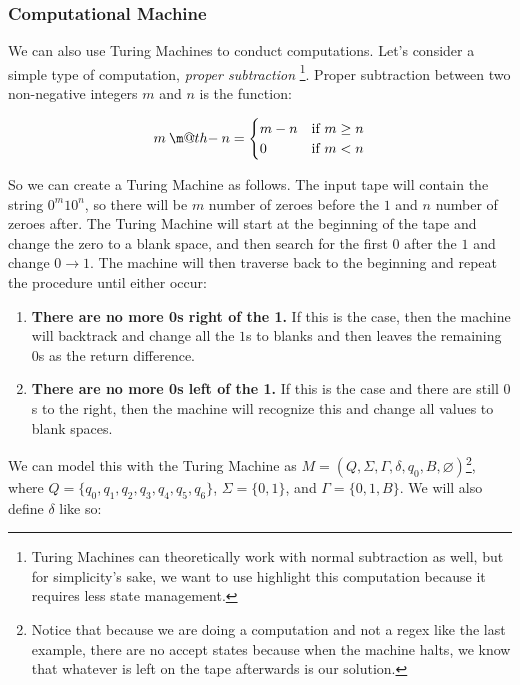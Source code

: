 \documentclass[12pt]{article}
\makeatletter
\newcommand{\dotminus}{\mathbin{\text{\@dotminus}}}
\newcommand{\@dotminus}{%
  \ooalign{\hidewidth\raise1ex\hbox{.}\hidewidth\cr$\m@th-$\cr}%
}
\makeatother
\begin{document}
\subsubsection*{Computational Machine}

We can also use Turing Machines to conduct computations. Let's consider a simple type of computation, \textit{proper subtraction} \footnote{Turing Machines can theoretically work with normal subtraction as well, but for simplicity's sake, we want to use highlight this computation because it requires less state management.}. Proper subtraction between two non-negative integers $m$ and $n$ is the function:

\[
m \dotminus n =  
\begin{cases} 
      m-n & \text{if $m\geq n$} \\
      0 & \text{if $m<n$}
   \end{cases}
\]

So we can create a Turing Machine as follows. The input tape will contain the string $0^m10^n$, so there will be $m$ number of zeroes before the $1$ and $n$ number of zeroes after. The Turing Machine will start at the beginning of the tape and change the zero to a blank space, and then search for the first $0$ after the $1$ and change $0 \to 1$. The machine will then traverse back to the beginning and repeat the procedure until either occur:

\begin{enumerate}

\item \textbf{There are no more 0s right of the 1.} If this is the case, then the machine will backtrack and change all the $1$s to blanks and then leaves the remaining $0$s as the return difference. 
\item \textbf{There are no more 0s left of the 1.} If this is the case and there are still $0$s to the right, then the machine will recognize this and change all values to blank spaces.

\end {enumerate}

We can model this with the Turing Machine as $M=(Q,\Sigma, \Gamma, \delta, q_0, B, \varnothing)$\footnote{Notice that because we are doing a computation and not a regex like the last example, there are no accept states because when the machine halts, we know that whatever is left on the tape afterwards is our solution.}, where $Q = \{q_0, q_1, q_2, q_3, q_4, q_5, q_6 \}$, $\Sigma = \{0,1\}$, and $\Gamma = \{0,1,B\}$. We will also define $\delta$ like so:
\end{document}
